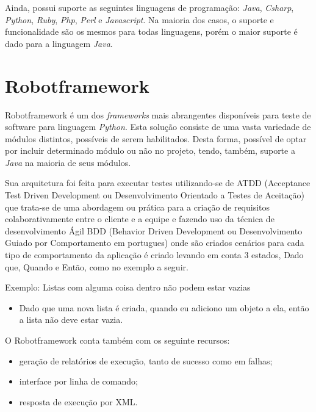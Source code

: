         Ainda, possui suporte as seguintes linguagens de programação: \emph{Java}, \emph{Csharp}, \emph{Python}, \emph{Ruby}, \emph{Php}, \emph{Perl} e \emph{Javascript}. Na maioria
        dos casos, o suporte e funcionalidade são os mesmos para todas linguagens, porém o maior suporte é dado para a linguagem \emph{Java}.


    \section{Robotframework}

        {Robotframework \cite{robotframework} é um dos \emph{frameworks} mais abrangentes disponíveis para teste de software para linguagem \emph{Python}. Esta solução consiste
        de uma vasta variedade de módulos distintos, possíveis de serem habilitados. Desta forma, possível de optar por incluir determinado módulo ou não no projeto, tendo, também,
        suporte a \emph{Java} na maioria de seus módulos.

        Sua arquitetura foi feita para executar testes utilizando-se de ATDD (Acceptance Test Driven Development ou Desenvolvimento Orientado a Testes de Aceitação) que trata-se de uma
        abordagem ou prática para a criação de requisitos colaborativamente entre o cliente e a equipe e fazendo uso da técnica de desenvolvimento Ágil BDD
        (Behavior Driven Development ou Desenvolvimento Guiado por Comportamento em portugues) onde são criados cenários para cada tipo de comportamento da aplicação é criado levando em
        conta 3 estados, Dado que, Quando e Então, como no exemplo a seguir.

        Exemplo: Listas com alguma coisa dentro não podem estar vazias
        \begin{itemize}
            \item Dado que uma nova lista é criada, quando eu adiciono um objeto a ela, então a lista não deve estar vazia.
        \end{itemize}

        O Robotframework conta também com os seguinte recursos:

        \begin{itemize}
            \item geração de relatórios de execução, tanto de sucesso como em falhas;
            \item interface por linha de comando;
            \item resposta de execução por XML.
        \end{itemize}


}
